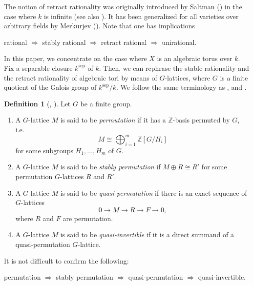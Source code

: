 \documentclass[12pt]{amsart}
\theoremstyle{plain}
\theoremstyle{definition}
\newtheorem{dfn}[thm]{Definition}
\numberwithin{thm}{section}
\numberwithin{equation}{section}
\newcommand{\Z}{\mathbb{Z}}
\DeclareMathOperator{\sep}{sep}
\begin{document}
The notion of retract rationality was originally introduced by Saltman (\cite{Saltman1984}) in the case where $k$ is infinite (see also \cite{Kang2012}). It has been generalized for all varieties over arbitrary fields by Merkurjev (\cite{Merkurjev2017}). Note that one has implications
\begin{center}
rational $\Rightarrow$ stably rational 
$\Rightarrow$ retract rational $\Rightarrow$ unirational. 
\end{center}

In this paper, we concentrate on the case where $X$ is an algebraic torus over $k$. Fix a separable closure $k^{\sep}$ of $k$. Then, we can rephrase the stable rationality and the retract rationality of algebraic tori by means of $G$-lattices, where $G$ is a finite quotient of the Galois group of $k^{\sep}/k$. We follow the same terminology as \cite{Lorenz2005}, \cite{Endo2011} and \cite[Section 2]{Hasegawa}. 

\begin{dfn}[{\cite[\S 1]{Endo2011}, \cite[Definition 2.1]{Hasegawa}}]
Let $G$ be a finite group. 
\begin{enumerate}
\item A $G$-lattice $M$ is said to be \emph{permutation} if it has a $\Z$-basis permuted by $G$, i.e.~
    \begin{equation*}
        M\cong \bigoplus_{i=1}^{m} \Z[G/H_i]
    \end{equation*}
for some subgroups $H_1,\ldots, H_m$ of $G$. 
\item A $G$-lattice $M$ is said to be \emph{stably permutation} if $M\oplus R\cong R'$ for some permutation $G$-lattices $R$ and $R'$.
\item A $G$-lattice $M$ is said to be \emph{quasi-permutation} if there is an exact sequence of $G$-lattices
\begin{equation*}
     0\rightarrow M \rightarrow R \rightarrow F \rightarrow 0, 
\end{equation*}
where $R$ and $F$ are permutation. 
\item A $G$-lattice $M$ is said to be \emph{quasi-invertible} if it is a direct summand of a quasi-permutation $G$-lattice.
\end{enumerate}
\end{dfn}

It is not difficult to confirm the following:
\begin{center}
permutation $\Rightarrow$ stably permutation $\Rightarrow$ quasi-permutation $\Rightarrow$ 
quasi-invertible. 
\end{center}
\end{document}
